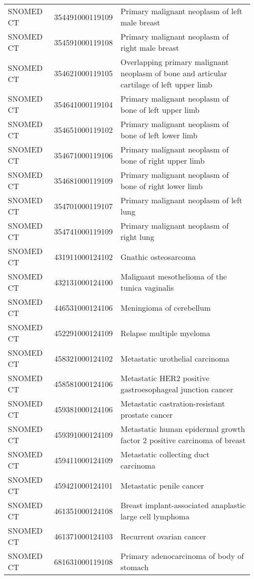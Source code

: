 \begin{longtable}{p{}p{}p{}}
  SNOMED CT & 354491000119109 & Primary malignant neoplasm of left male breast \\ 
  SNOMED CT & 354591000119108 & Primary malignant neoplasm of right male breast \\ 
  SNOMED CT & 354621000119105 & Overlapping primary malignant neoplasm of bone and articular cartilage of left upper limb \\ 
  SNOMED CT & 354641000119104 & Primary malignant neoplasm of bone of left upper limb \\ 
  SNOMED CT & 354651000119102 & Primary malignant neoplasm of bone of left lower limb \\ 
  SNOMED CT & 354671000119106 & Primary malignant neoplasm of bone of right upper limb \\ 
  SNOMED CT & 354681000119109 & Primary malignant neoplasm of bone of right lower limb \\ 
  SNOMED CT & 354701000119107 & Primary malignant neoplasm of left lung \\ 
  SNOMED CT & 354741000119109 & Primary malignant neoplasm of right lung \\ 
  SNOMED CT & 431911000124102 & Gnathic osteosarcoma \\ 
  SNOMED CT & 432131000124100 & Malignant mesothelioma of the tunica vaginalis \\ 
  SNOMED CT & 446531000124106 & Meningioma of cerebellum \\ 
  SNOMED CT & 452291000124109 & Relapse multiple myeloma \\ 
  SNOMED CT & 458321000124102 & Metastatic urothelial carcinoma \\ 
  SNOMED CT & 458581000124106 & Metastatic HER2 positive gastroesophageal junction cancer \\ 
  SNOMED CT & 459381000124106 & Metastatic castration-resistant prostate cancer \\ 
  SNOMED CT & 459391000124109 & Metastatic human epidermal growth factor 2 positive carcinoma of breast \\ 
  SNOMED CT & 459411000124109 & Metastatic collecting duct carcinoma \\ 
  SNOMED CT & 459421000124101 & Metastatic penile cancer \\ 
  SNOMED CT & 461351000124108 & Breast implant-associated anaplastic large cell lymphoma \\ 
  SNOMED CT & 461371000124103 & Recurrent ovarian cancer \\ 
  SNOMED CT & 681631000119108 & Primary adenocarcinoma of body of stomach \\ 

\end{longtable}
